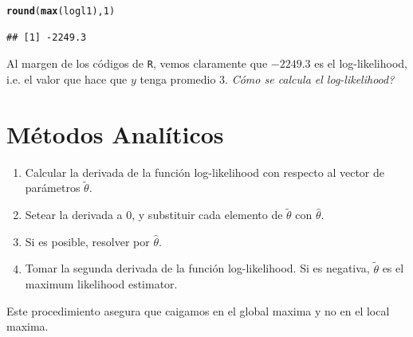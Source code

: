 \documentclass[onesided]{article}\usepackage[]{graphicx}\usepackage[]{color}
\makeatletter
\newcommand{\hlnum}[1]{\textcolor[rgb]{0.686,0.059,0.569}{#1}}%
\newcommand{\hlstd}[1]{\textcolor[rgb]{0.345,0.345,0.345}{#1}}%
\newcommand{\hlkwd}[1]{\textcolor[rgb]{0.737,0.353,0.396}{\textbf{#1}}}%
\newenvironment{kframe}{%
 \def\at@end@of@kframe{}%
 \ifinner\ifhmode%
  \def\at@end@of@kframe{\end{minipage}}%
  \begin{minipage}{\columnwidth}%
 \fi\fi%
 \def\FrameCommand##1{\hskip\@totalleftmargin \hskip-\fboxsep
 \colorbox{shadecolor}{##1}\hskip-\fboxsep
     \hskip-\linewidth \hskip-\@totalleftmargin \hskip\columnwidth}%
 \MakeFramed {\advance\hsize-\width
   \@totalleftmargin\z@ \linewidth\hsize
   \@setminipage}}%
 {\par\unskip\endMakeFramed%
 \at@end@of@kframe}
\newenvironment{knitrout}{}{} %
\makeatother
\begin{document}
\begin{knitrout}
\color{fgcolor}\begin{kframe}
\begin{alltt}
\hlkwd{round}\hlstd{(}\hlkwd{max}\hlstd{(logl1),}\hlnum{1}\hlstd{)}
\end{alltt}
\begin{verbatim}
## [1] -2249.3
\end{verbatim}
\end{kframe}
\end{knitrout}

Al margen de los c\'odigos de \texttt{R}, vemos claramente que $-2249.3$ es el log-likelihood, i.e. el valor que hace que $y$ tenga promedio $3$. \emph{C\'omo se calcula el log-likelihood?}

\section{M\'etodos Anal\'iticos}

\begin{enumerate}
	\item Calcular la derivada de la funci\'on log-likelihood con respecto al vector de par\'ametros  $\tilde\theta$. 
	\item Setear la derivada a 0, y substituir cada elemento de $\tilde\theta$ con $\hat\theta$.
	\item Si es posible, resolver por $\hat\theta$.
	\item Tomar la segunda derivada de la funci\'on log-likelihood. Si es negativa, $\tilde\theta$ es el maximum likelihood estimator. 
\end{enumerate}

Este procedimiento asegura que caigamos en el {\color{red}global maxima} y no en el {\color{blue}local maxima}.
\end{document}
